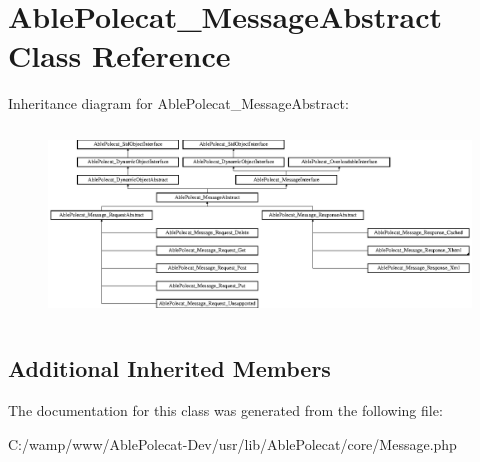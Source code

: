 \hypertarget{class_able_polecat___message_abstract}{}\section{Able\+Polecat\+\_\+\+Message\+Abstract Class Reference}
\label{class_able_polecat___message_abstract}
Inheritance diagram for Able\+Polecat\+\_\+\+Message\+Abstract\+:\begin{figure}[H]
\begin{center}
\leavevmode
\includegraphics[height=5.090909cm]{class_able_polecat___message_abstract}
\end{center}
\end{figure}
\subsection*{Additional Inherited Members}


The documentation for this class was generated from the following file\+:\begin{DoxyCompactItemize}
\item 
C\+:/wamp/www/\+Able\+Polecat-\/\+Dev/usr/lib/\+Able\+Polecat/core/Message.\+php\end{DoxyCompactItemize}
